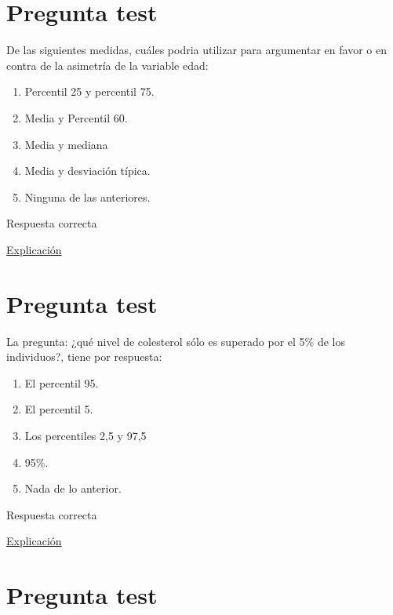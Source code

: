 \documentclass[
]{book}
\providecommand{\tightlist}{%
  \setlength{\itemsep}{0pt}\setlength{\parskip}{0pt}}
\begin{document}
\hypertarget{pregunta-test-69}{%
\section{Pregunta test}\label{pregunta-test-69}}

De las siguientes medidas, cuáles podria utilizar para argumentar en favor o en contra de la asimetría de la variable edad:

\begin{enumerate}
\def\labelenumi{\alph{enumi})}
\tightlist
\item
  Percentil 25 y percentil 75.
\item
  Media y Percentil 60.
\item
  Media y mediana
\item
  Media y desviación típica.
\item
  Ninguna de las anteriores.
\end{enumerate}

Respuesta correcta

\href{https://1fjmanzano.github.io/bioestadistica/medidas-de-forma.html}{Explicación}

\hypertarget{pregunta-test-70}{%
\section{Pregunta test}\label{pregunta-test-70}}

La pregunta: ¿qué nivel de colesterol sólo es superado por el 5\% de los individuos?, tiene por respuesta:

\begin{enumerate}
\def\labelenumi{\alph{enumi})}
\tightlist
\item
  El percentil 95.
\item
  El percentil 5.
\item
  Los percentiles 2,5 y 97,5
\item
  95\%.
\item
  Nada de lo anterior.
\end{enumerate}

Respuesta correcta

\href{https://1fjmanzano.github.io/bioestadistica/medidas-de-posicio\%CC\%81n-dispersio\%CC\%81n-y-forma.html\#medidas-de-posicio\%CC\%81n-no-centrales}{Explicación}

\hypertarget{pregunta-test-71}{%
\section{Pregunta test}\label{pregunta-test-71}}
\end{document}
